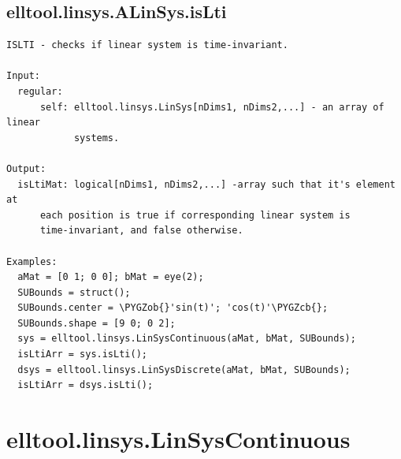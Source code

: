 \documentclass[letterpaper,10pt,english]{sphinxmanual}
\def\PYGZob{\char`\{}
\def\PYGZcb{\char`\}}
\begin{document}
\subsection{elltool.linsys.ALinSys.isLti}
\label{chap_functions:elltool-linsys-alinsys-islti}
\begin{Verbatim}[commandchars=\\\{\}]
ISLTI - checks if linear system is time-invariant.

Input:
  regular:
      self: elltool.linsys.LinSys[nDims1, nDims2,...] - an array of linear
            systems.

Output:
  isLtiMat: logical[nDims1, nDims2,...] -array such that it's element at
      each position is true if corresponding linear system is
      time-invariant, and false otherwise.

Examples:
  aMat = [0 1; 0 0]; bMat = eye(2);
  SUBounds = struct();
  SUBounds.center = \PYGZob{}'sin(t)'; 'cos(t)'\PYGZcb{};
  SUBounds.shape = [9 0; 0 2];
  sys = elltool.linsys.LinSysContinuous(aMat, bMat, SUBounds);
  isLtiArr = sys.isLti();
  dsys = elltool.linsys.LinSysDiscrete(aMat, bMat, SUBounds);
  isLtiArr = dsys.isLti();
\end{Verbatim}


\section{elltool.linsys.LinSysContinuous}
\label{chap_functions:elltool-linsys-linsyscontinuous}
\end{document}
